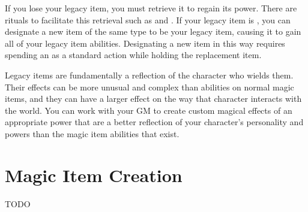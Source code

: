    If you lose your legacy item, you must retrieve it to regain its power.
    There are rituals to facilitate this retrieval such as  and .
    If your legacy item is , you can designate a new item of the same type to be your legacy item, causing it to gain all of your legacy item abilities.
    Designating a new item in this way requires spending an  as a standard action while holding the replacement item.

        Legacy items are fundamentally a reflection of the character who wields them.
        Their effects can be more unusual and complex than abilities on normal magic items, and they can have a larger effect on the way that character interacts with the world.
        You can work with your GM to create custom magical effects of an appropriate power that are a better reflection of your character's personality and powers than the magic item abilities that exist.

\section{Magic Item Creation}\label{Magic Item Creation}

    TODO
